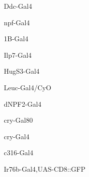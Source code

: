 \documentclass[17pt]{extarticle}
\begin{document}
\begin{large}
Ddc-Gal4 \\[0.5em]
\end{large}
\footnotesize
\newpage\vspace*{-0.15cm}
\begin{large}
npf-Gal4 \\[0.5em]
\end{large}
\footnotesize
\newpage\vspace*{-0.15cm}
\begin{large}
1B-Gal4 \\[0.5em]
\end{large}
\footnotesize
\newpage\vspace*{-0.15cm}
\begin{large}
Ilp7-Gal4 \\[0.5em]
\end{large}
\footnotesize
\newpage\vspace*{-0.15cm}
\begin{large}
HugS3-Gal4 \\[0.5em]
\end{large}
\footnotesize
\newpage\vspace*{-0.15cm}
\begin{normalsize}
Leuc-Gal4/CyO \\[0.5em]
\end{normalsize}
\footnotesize
\newpage\vspace*{-0.15cm}
\begin{large}
dNPF2-Gal4 \\[0.5em]
\end{large}
\footnotesize
\newpage\vspace*{-0.15cm}
\begin{large}
cry-Gal80 \\[0.5em]
\end{large}
\footnotesize
\newpage\vspace*{-0.15cm}
\begin{large}
cry-Gal4 \\[0.5em]
\end{large}
\footnotesize
\newpage\vspace*{-0.15cm}
\begin{large}
c316-Gal4 \\[0.5em]
\end{large}
\footnotesize
\newpage\vspace*{-0.15cm}
\begin{footnotesize}
Ir76b-Gal4,UAS-CD8::GFP \\[0.5em]
\end{footnotesize}
\end{document}
